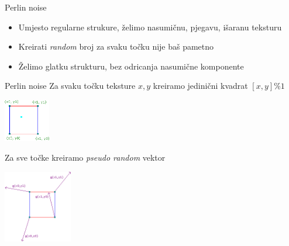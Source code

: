 \documentclass[9pt]{beamer}
\begin{document}
\begin{frame}{Perlin noise}
	\begin{itemize}
		\item Umjesto regularne strukure, želimo nasumičnu, pjegavu, išaranu teksturu
		\item Kreirati \textit{random} broj za svaku točku nije baš pametno 
		\item Želimo glatku strukturu, bez odricanja nasumične komponente
	\end{itemize}
	
	
%	
\end{frame}
\begin{frame}{Perlin noise}
	Za svaku točku  teksture $x, y$ kreiramo jedinični kvadrat $\left[x, y \right] \% 1$
	\begin{center}
		\includegraphics[width=2cm]{slike/logic01.png}
	\end{center}
	Za sve točke kreiramo \textit{pseudo random} vektor
	\begin{center}
		\includegraphics[width=3cm]{slike/logic02.png}
	\end{center}
\end{frame}
\end{document}
